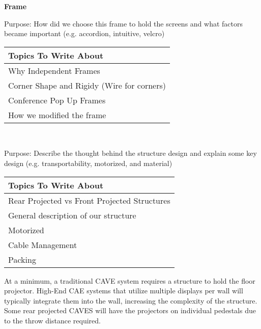 \filbreak
\noindent\textbf{Frame} \\
\begin{center}
	\textcolor{OliveGreen}{Purpose: How did we choose this frame to hold the screens and what factors became important (e.g. accordion, intuitive, velcro)}
	
	\begin{table}[H]
		\centering
		\renewcommand\arraystretch{0.5}
		\begin{tabular}{|l|}
			\hline 
			Topics To Write About \\ 
			\hline 
			Why Independent Frames \\  
			Corner Shape and Rigidy (Wire for corners) \\
			Conference Pop Up Frames \\
			How we  modified the frame \\ 
			\hline 
		\end{tabular}
	\end{table}
\end{center}

\label{sec:hwScreensSection}\\
\begin{center}
    \textcolor{OliveGreen}{
        Purpose: Describe the thought behind the structure design and explain some key design (e.g. transportability, motorized, and material)
    }

    \begin{table}[H]
        \centering
        \renewcommand\arraystretch{0.5}
        \begin{tabular}{|l|}
            \hline 
            Topics To Write About \\ 
            \hline 
            Rear Projected vs Front Projected Structures \\  
            General description of our structure\\
            Motorized  \\
            Cable Management  \\
            Packing  \\
            \hline 
        \end{tabular}
    \end{table}
\end{center}

At a minimum, a traditional CAVE system requires a structure to hold the floor projector. High-End CAE systems that utilize multiple displays per wall will typically integrate them into the wall, increasing the complexity of the structure. Some rear projected CAVES will have the projectors on individual pedestals due to the throw distance required.

